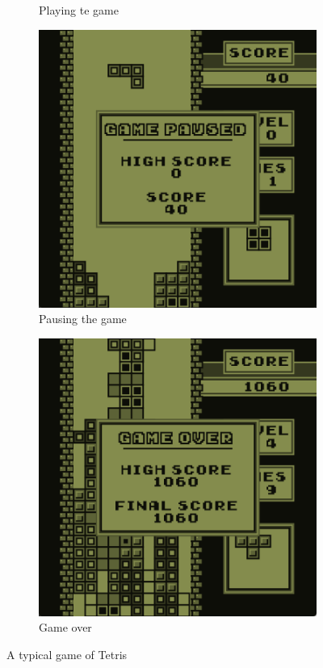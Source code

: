 \begin{figure}[H]
\begin{subfigure}[b]{0.35\textwidth}
        \caption{Playing te game}
        \label{fig: game}
    \end{subfigure}
    \begin{subfigure}[b]{0.35\textwidth}
        \centering
        \includegraphics[width=\textwidth]{Figures/day_5/game_paused.png}
        \caption{Pausing the game}
        \label{fig: paused game}
    \end{subfigure}
    \hspace{1cm}
    \begin{subfigure}[b]{0.35\textwidth}
        \centering
        \includegraphics[width=\textwidth]{Figures/day_5/game_over.png}
        \caption{Game over}
        \label{fig: game over}
    \end{subfigure}

    \caption{A typical game of Tetris}
    \label{fig: tetris}

\end{figure}